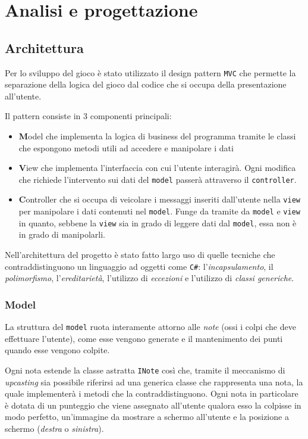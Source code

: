 \section{Analisi e progettazione}
\subsection{Architettura}
Per lo sviluppo del gioco è stato utilizzato il design pattern \texttt{MVC} che permette la separazione della logica del gioco dal codice che si occupa della presentazione all'utente.

Il pattern consiste in 3 componenti principali:
\begin{itemize}
    \item \textbf{M}odel che implementa la logica di business del programma tramite le classi che espongono metodi utili ad accedere e manipolare i dati

    \item \textbf{V}iew che implementa l'interfaccia con cui l'utente interagirà. Ogni modifica che richiede l'intervento sui dati del \texttt{model} passerà attraverso il \texttt{controller}.

    \item \textbf{C}ontroller che si occupa di veicolare i messaggi inseriti dall'utente nella \texttt{view} per manipolare i dati contenuti nel \texttt{model}.
          Funge da tramite da \texttt{model} e \texttt{view} in quanto, sebbene la \texttt{view} sia in grado di leggere dati dal \texttt{model}, essa non è in grado di manipolarli.
\end{itemize}

\vspace{0.5cm}
Nell'architettura del progetto è stato fatto largo uso di quelle tecniche che contraddistinguono un linguaggio ad oggetti come \texttt{C\#}: l'\emph{incapsulamento}, il \emph{polimorfismo}, l'\emph{ereditarietà}, l'utilizzo di \emph{eccezioni} e l'utilizzo di \emph{classi generiche}.

\subsubsection{Model}
La struttura del \texttt{model} ruota interamente attorno alle \emph{note} (ossi i colpi che deve effettuare l'utente), come esse vengono generate e il mantenimento dei punti quando esse vengono colpite.

Ogni nota estende la classe astratta \texttt{INote} così che, tramite il meccanismo di \emph{upcasting} sia possibile riferirsi ad una generica classe che rappresenta una nota, la quale implementerà i metodi che la contraddistinguono.
Ogni nota in particolare è dotata di un punteggio che viene assegnato all'utente qualora esso la colpisse in modo perfetto, un'immagine da mostrare a schermo all'utente e la posizione a schermo (\emph{destra} o \emph{sinistra}).

